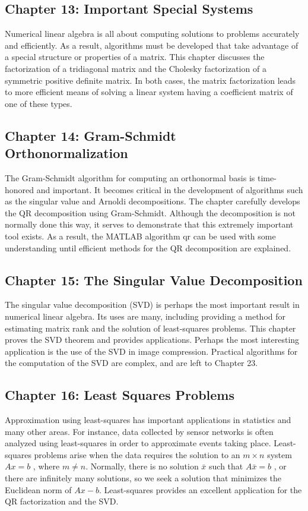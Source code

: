 \documentclass[../main.tex]{subfiles}
\begin{document}
\subsection*{Chapter 13: Important Special Systems}
Numerical linear algebra is all about computing solutions to problems accurately and efficiently. As a result, algorithms must be developed that take advantage of a special structure or properties of a matrix. This chapter discusses the factorization of a tridiagonal matrix and the Cholesky factorization of a symmetric positive definite matrix. In both cases, the matrix factorization leads to more efficient means of solving a linear system having a coefficient matrix of one of these types.

\subsection*{Chapter 14: Gram-Schmidt Orthonormalization}
The Gram-Schmidt algorithm for computing an orthonormal basis is time-honored and important. It becomes critical in the development of algorithms such as the singular value and Arnoldi decompositions. The chapter carefully develops the QR decomposition using Gram-Schmidt. Although the decomposition is not normally done this way, it serves to demonstrate that this extremely important tool exists. As a result, the MATLAB algorithm qr can be used with some understanding until efficient methods for the QR decomposition are explained.

\subsection*{Chapter 15: The Singular Value Decomposition}
The singular value decomposition (SVD) is perhaps the most important result in numerical linear algebra. Its uses are many, including providing a method for estimating matrix rank and the solution of least-squares problems. This chapter proves the SVD theorem and provides applications. Perhaps the most interesting application is the use of the SVD in image compression. Practical algorithms for the computation of the SVD are complex, and are left to Chapter 23.

\subsection*{Chapter 16: Least Squares Problems}
Approximation using least-squares has important applications in statistics and many other areas. For instance, data collected by sensor networks is often analyzed using least-squares in order to approximate events taking place. Least-squares problems arise when the data requires the solution to an $m \times  n$ system $Ax = b$ , where $m \neq n$. Normally, there is no solution $ \bar{x}$ such that $A \bar{x} = b$ , or there are infinitely many solutions, so we seek a solution that minimizes the Euclidean norm of $Ax - b$. Least-squares provides an excellent application for the QR factorization and the SVD.
\end{document}
